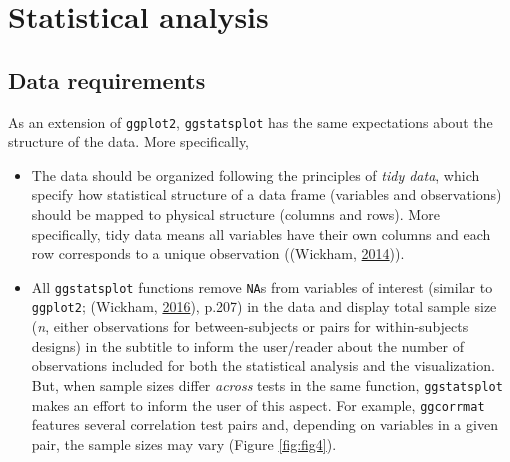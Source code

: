 \documentclass[
]{article}
\begin{document}
\hypertarget{statistical-analysis}{%
\section{Statistical analysis}\label{statistical-analysis}}

\hypertarget{data-requirements}{%
\subsection{Data requirements}\label{data-requirements}}

As an extension of \texttt{ggplot2}, \texttt{ggstatsplot} has the same expectations about the
structure of the data. More specifically,

\begin{itemize}
\item
  The data should be organized following the principles of \emph{tidy data}, which
  specify how statistical structure of a data frame (variables and
  observations) should be mapped to physical structure (columns and rows).
  More specifically, tidy data means all variables have their own columns and
  each row corresponds to a unique observation ((Wickham, \protect\hyperlink{ref-wickhamTidyData2014}{2014})).
\item
  All \texttt{ggstatsplot} functions remove \texttt{NA}s from variables of interest (similar
  to \texttt{ggplot2}; (Wickham, \protect\hyperlink{ref-wickhamGgplot2ElegantGraphics2016}{2016}), p.207) in the data and
  display total sample size (\emph{n}, either observations for between-subjects or
  pairs for within-subjects designs) in the subtitle to inform the user/reader
  about the number of observations included for both the statistical analysis
  and the visualization. But, when sample sizes differ \emph{across} tests in the
  same function, \texttt{ggstatsplot} makes an effort to inform the user of this
  aspect. For example, \texttt{ggcorrmat} features several correlation test pairs
  and, depending on variables in a given pair, the sample sizes may vary
  (Figure \ref{fig:fig4}).
\end{itemize}
\end{document}
